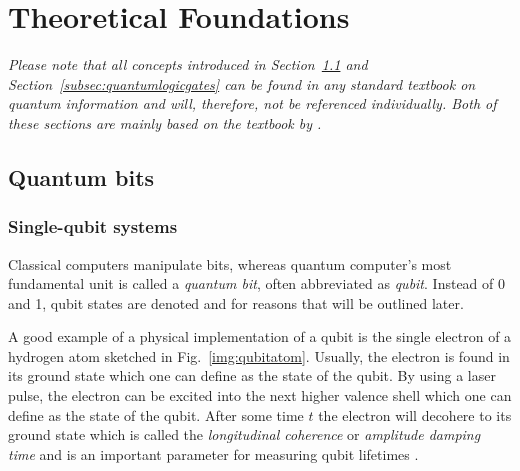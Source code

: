 \chapter{Theoretical Foundations}\label{sec:theory}
\emph{Please note that all concepts introduced in Section~\ref{subsec:qubits} and Section~\ref{subsec:quantumlogicgates} can be found in any standard textbook on quantum information and will, therefore, not be referenced individually. Both of these sections are mainly based on the textbook by .}
\section{Quantum bits}
\label{subsec:qubits}
\subsection{Single-qubit systems}
\label{subsubsec:qubits}

Classical computers manipulate bits, whereas quantum computer's most fundamental unit is called a \emph{quantum bit}, often abbreviated as \emph{qubit}. Instead of 0 and 1, qubit states are denoted \0 and \1 for reasons that will be outlined later.

A good example of a physical implementation of a qubit is the single electron of a hydrogen atom sketched in Fig.~\ref{img:qubitatom}. Usually, the electron is found in its ground state which one can define as the \0 state of the qubit. By using a laser pulse, the electron can be excited into the next higher valence shell which one can define as the \1 state of the qubit. After some time $t$ the electron will decohere to its ground state \0 which is called the \emph{longitudinal coherence} or \emph{amplitude damping time} and is an important parameter for measuring qubit lifetimes \cite{chuanglecturenotes}.

